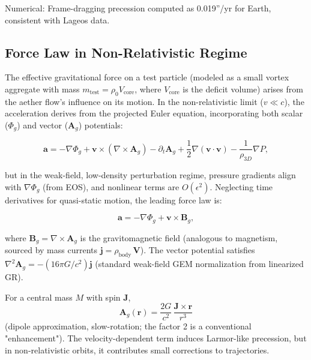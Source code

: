 Numerical: Frame-dragging precession computed as 0.019''/yr for Earth, consistent with Lageos data.

\medskip
\noindent
{}
\medskip

\subsection{Force Law in Non-Relativistic Regime}

The effective gravitational force on a test particle (modeled as a small vortex aggregate with mass $m_{\text{test}} = \rho_0 V_{\text{core}}$, where $V_{\text{core}}$ is the deficit volume) arises from the aether flow's influence on its motion. In the non-relativistic limit ($v \ll c$), the acceleration derives from the projected Euler equation, incorporating both scalar ($\Phi_g$) and vector ($\mathbf{A}_g$) potentials:

\[
\mathbf{a} = -\nabla \Phi_g + \mathbf{v} \times (\nabla \times \mathbf{A}_g) - \partial_t \mathbf{A}_g + \frac{1}{2} \nabla (\mathbf{v} \cdot \mathbf{v}) - \frac{1}{\rho_{3D}} \nabla P,
\]

but in the weak-field, low-density perturbation regime, pressure gradients align with $\nabla \Phi_g$ (from EOS), and nonlinear terms are $O(\epsilon^2)$. Neglecting time derivatives for quasi-static motion, the leading force law is:

\[
\mathbf{a} = -\nabla \Phi_g + \mathbf{v} \times \mathbf{B}_g,
\]

where $\mathbf{B}_g = \nabla \times \mathbf{A}_g$ is the gravitomagnetic field (analogous to magnetism, sourced by mass currents $\mathbf{j} = \rho_{\text{body}} \, \mathbf{V}$). The vector potential satisfies $\nabla^2 \mathbf{A}_g = - (16\pi G / c^2) \mathbf{j}$ (standard weak-field GEM normalization from linearized GR).

For a central mass $M$ with spin $\mathbf{J}$,
\[
\mathbf{A}_g(\mathbf{r}) = \frac{2G}{c^2} \, \frac{\mathbf{J} \times \mathbf{r}}{r^3}
\]
(dipole approximation, slow-rotation; the factor 2 is a conventional "enhancement"). The velocity-dependent term induces Larmor-like precession, but in non-relativistic orbits, it contributes small corrections to trajectories.

